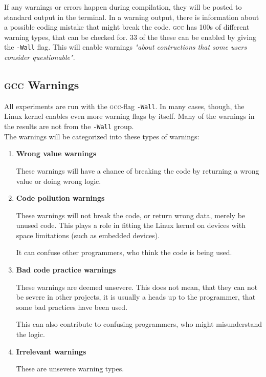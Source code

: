 \documentclass[a4paper,11pt]{report}
\newcommand{\textcode}[1]{\fboxsep=1pt\texttt{\colorbox{gray!20}{#1}}}
\begin{document}
If any warnings or errors happen during compilation, they will be posted to standard output in the terminal.
In a warning output, there is information about a possible coding mistake that 
might break the code. \textsc{gcc} has 100s of different warning types, that can be 
checked for. 33 of the these can be enabled by giving the \textcode{-Wall} flag.
 This will enable warnings \emph{"about contructions that some users consider 
questionable"}\cite{gccwarnings}.



            \subsection{\textsc{gcc} Warnings}
            \label{sec:gccwarns}
All experiments are run with the \textsc{gcc}-flag \textcode{-Wall}. In many 
cases, though, the Linux kernel enables even more warning flags by itself.
Many of the warnings in the results are not from the \texttt{-Wall} group.
\\

The warnings will be categorized into these types of warnings:

\begin{enumerate}
    \item \textbf{Wrong value warnings}

These warnings will have a chance of breaking the code by returning a wrong
value or doing wrong logic.

    \item \textbf{Code pollution warnings}

These warnings will not break the code, or return wrong data, merely be 
unused code. This plays a role in fitting the Linux kernel on devices with 
space limitations (such as embedded devices).

It can confuse other programmers, who think the code is being used.

    \item \textbf{Bad code practice warnings}

These warnings are deemed unsevere. This does not mean, that they can not be 
severe in other projects, it is usually a heads up to the programmer, that some 
bad practices have been used.

This can also contribute to confusing programmers, who might misunderstand the 
logic.


    \item \textbf{Irrelevant warnings}

These are unsevere warning types.

\end{enumerate}
\end{document}
